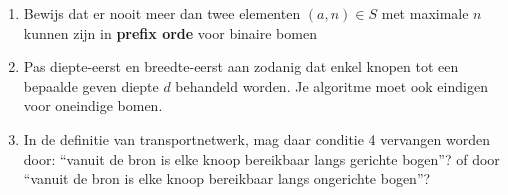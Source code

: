 \begin{enumerate}
\item Bewijs dat er nooit meer dan twee elementen $(a,n) \in S$
met maximale $n$ kunnen zijn in \textbf{prefix orde} voor binaire bomen

\item Pas diepte-eerst en breedte-eerst aan zodanig dat enkel
knopen tot een bepaalde geven diepte $d$ behandeld worden. Je algoritme
moet ook eindigen voor oneindige bomen.

\item In de definitie van transportnetwerk, mag daar conditie 4
vervangen worden door: ``vanuit de bron is elke knoop bereikbaar langs
gerichte bogen''? of door ``vanuit de bron is elke knoop bereikbaar
langs ongerichte bogen''?

\end{enumerate}

